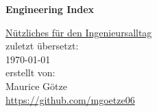 
{}

\makeindex

\def\header{
    \vspace{5cm}
  \begin{center}
    {\vspace{5cm}\Huge \textbf{Engineering Index}}\\\vspace{2cm}
        {\large \underline{Nützliches für den Ingenieursalltag}\\\vspace{5cm}
               zuletzt übersetzt:\\\today\\\vspace{1cm}
        erstellt von:\\Maurice Götze\\\vspace{1cm}\url{https://github.com/mgoetze06}
        
        }
  \end{center}
}
\thispagestyle{empty}

\header
\thispagestyle{empty}
\clearpage
{}
\tableofcontents

\newpage



\pagestyle{fancy}
    \fancyhf{}
    \fancyfoot[C]{\color{\chaptercolor}\thepage /\pageref*{LastPage}}
    \fancyhead[R]{\color{\chaptercolor}\leftmark}%
    \renewcommand{\headrulewidth}{0.5pt}
    \renewcommand{\footrulewidth}{0.5pt}
    
